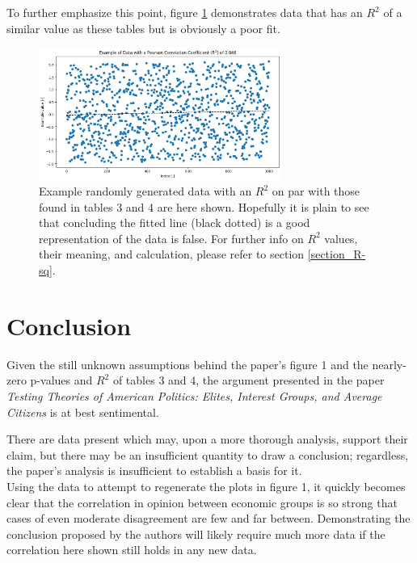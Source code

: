 \documentclass[]{article}
\begin{document}
To further emphasize this point, figure \ref{generated_low_r2} demonstrates data that has an $R^2$ of a similar value as these tables but is obviously a poor fit.
\begin{figure}[H]
	\begin{center}
		\includegraphics[width=300px]{./figures/generated/example-low-r2-plot.png}
	\end{center}	
	\caption{Example randomly generated data with an $R^2$ on par with those found in tables 3 and 4 are here shown. Hopefully it is plain to see that concluding the fitted line (black dotted) is a good representation of the data is false. For further info on $R^2$ values, their meaning, and calculation, please refer to section \ref{section_R-sq}.}
	\label{generated_low_r2}
\end{figure}


\section{Conclusion}
Given the still unknown assumptions behind the paper's figure 1 and the nearly-zero p-values and $R^2$ of tables 3 and 4, the argument presented in the paper \textit{Testing Theories of American Politics: Elites, Interest Groups, and Average Citizens} is at best sentimental.

There are data present which may, upon a more thorough analysis, support their claim, but there may be an insufficient quantity to draw a conclusion; regardless, the paper's analysis is insufficient to establish a basis for it.\\

Using the data to attempt to regenerate the plots in figure 1, it quickly becomes clear that the correlation in opinion between economic groups is so strong that cases of even moderate disagreement are few and far between.
Demonstrating the conclusion proposed by the authors will likely require much more data if the correlation here shown still holds in any new data.

\newpage

\end{document}
